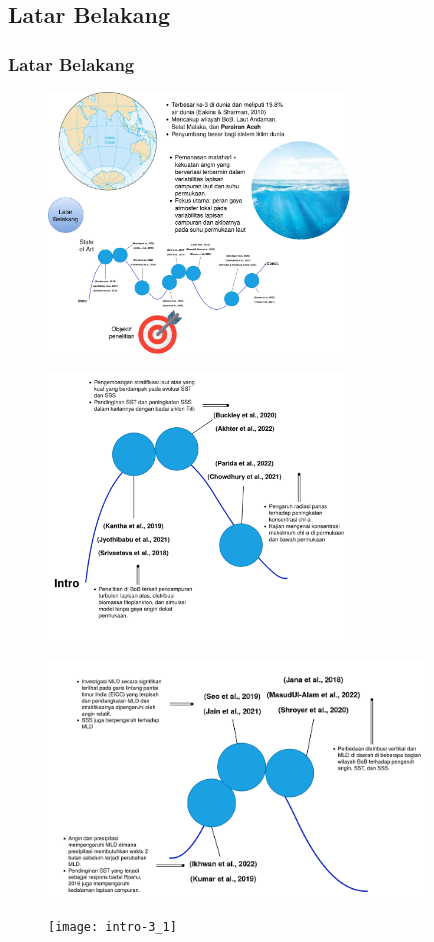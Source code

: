 \documentclass{beamer}
\begin{document}
\subsection{Latar Belakang}
\begin{frame}[allowframebreaks]
\frametitle{Latar Belakang}
	\begin{figure}[H]
		\centering
		\includegraphics[width=8cm]{intro-0}
	\end{figure}
	\begin{figure}[H]
		\centering
		\includegraphics[width=8cm]{intro-1_1}
	\end{figure}
	\begin{figure}[H]
		\centering
		\includegraphics[width=10cm]{intro-2_1}
	\end{figure}
	\begin{figure}[H]
		\centering
		\texttt{[image: intro-3\_1]}
	\end{figure}
\end{frame}
\end{document}
